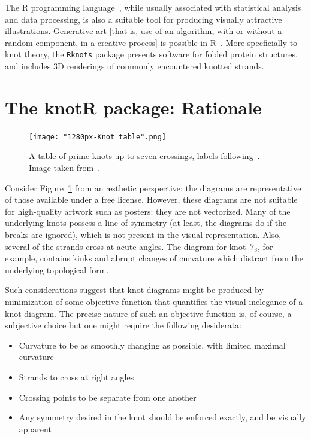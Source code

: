 \documentclass{birkjour}
\theoremstyle{definition}
\theoremstyle{remark}
\numberwithin{equation}{section}
\begin{document}
The R programming language~\cite{rcore2021}, while usually associated
with statistical analysis and data processing, is also a suitable tool
for producing visually attractive illustrations.  Generative art [that
  is, use of an algorithm, with or without a random component, in a
  creative process] is possible in R~\cite{brunner2021}.  More
specficially to knot theory, the {\tt Rknots}
package\cite{comoglio2011,comoglio2016} presents software for folded
protein structures, and includes 3D renderings of commonly encountered
knotted strands.

\section{The knotR package: Rationale}

\begin{figure}[h]
  \centering
  \texttt{[image: "1280px-Knot\_table".png]}
  \caption{A table of prime knots up \label{knot_table} to seven
    crossings, labels following~\cite{alexander1926}.  Image taken
    from~\cite{wikipedia_knot_theory}.}
\end{figure}

Consider Figure~\ref{knot_table} from an \ae sthetic perspective; the
diagrams are representative of those available under a free license.
However, these diagrams are not suitable for high-quality artwork such
as posters: they are not vectorized.  Many of the underlying knots
possess a line of symmetry (at least, the diagrams do if the breaks
are ignored), which is not present in the visual representation.
Also, several of the strands cross at acute angles.  The diagram for
knot~$7_3$, for example, contains kinks and abrupt changes of
curvature which distract from the underlying topological form.

Such considerations suggest that knot diagrams might be produced by
minimization of some objective function that quantifies the visual
inelegance of a knot diagram.  The precise nature of such an objective
function is, of course, a subjective choice but one might require the
following desiderata:

\begin{itemize}
\item Curvature to be as smoothly changing as possible, with limited maximal curvature
\item Strands to cross at right angles
\item Crossing points to be separate from one another
\item Any symmetry desired in the knot should be enforced exactly, and be visually apparent
\end{itemize}
\end{document}
